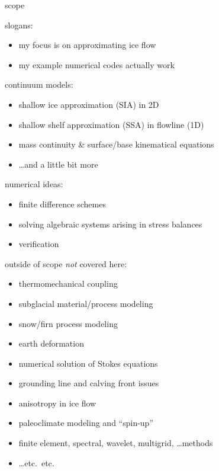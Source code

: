 \begin{frame}{scope}

slogans:
  \begin{itemize}
  \item \alert{my focus is on approximating ice flow}
  \item \alert{my example numerical codes actually work}
  \end{itemize}
\medskip

continuum models:
  \begin{itemize}
  \item shallow ice approximation (SIA) in 2D
  \item shallow shelf approximation (SSA) in flowline (1D)
  \item mass continuity \& surface/base kinematical equations
  \item \dots and a little bit more
  \end{itemize}

\medskip
numerical ideas:
  \begin{itemize}
  \item finite difference schemes
  \item solving algebraic systems arising in stress balances
  \item verification
  \end{itemize}
\end{frame}


\begin{frame}{outside of scope}
\large\emph{not} \normalsize covered here:
  \begin{itemize}
  \item thermomechanical coupling
  \item subglacial material/process modeling
  \item snow/firn process modeling
  \item earth deformation
  \item numerical solution of Stokes equations
  \item grounding line and calving front issues
  \item anisotropy in ice flow
  \item paleoclimate modeling and ``spin-up''
  \item finite element, spectral, wavelet, multigrid, \dots methods
  \item \dots etc.~etc.
  \end{itemize}
\end{frame}


